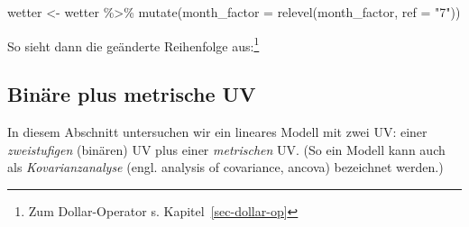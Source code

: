 \documentclass[
  letterpaper,
  twoside,
  open=any]{scrbook}
\newenvironment{Shaded}{\begin{snugshade}}{\end{snugshade}}
\newcommand{\AttributeTok}[1]{\textcolor[rgb]{0.40,0.45,0.13}{#1}}
\newcommand{\DocumentationTok}[1]{\textcolor[rgb]{0.37,0.37,0.37}{\textit{#1}}}
\newcommand{\FunctionTok}[1]{\textcolor[rgb]{0.28,0.35,0.67}{#1}}
\newcommand{\NormalTok}[1]{\textcolor[rgb]{0.00,0.23,0.31}{#1}}
\newcommand{\OtherTok}[1]{\textcolor[rgb]{0.00,0.23,0.31}{#1}}
\newcommand{\SpecialCharTok}[1]{\textcolor[rgb]{0.37,0.37,0.37}{#1}}
\newcommand{\StringTok}[1]{\textcolor[rgb]{0.13,0.47,0.30}{#1}}
\theoremstyle{definition}
\theoremstyle{definition}
\theoremstyle{definition}
\theoremstyle{remark}
\begin{document}
\begin{Shaded}
\begin{Highlighting}[]
\NormalTok{wetter }\OtherTok{\textless{}{-}}
\NormalTok{  wetter }\SpecialCharTok{\%\textgreater{}\%} 
  \FunctionTok{mutate}\NormalTok{(}\AttributeTok{month\_factor =} \FunctionTok{relevel}\NormalTok{(month\_factor, }\AttributeTok{ref =} \StringTok{"7"}\NormalTok{))}
\end{Highlighting}
\end{Shaded}

So sieht dann die geänderte Reihenfolge aus:\footnote{Zum
  Dollar-Operator s. Kapitel~\ref{sec-dollar-op}}

\begin{Shaded}
\end{Shaded}

\subsection{Binäre plus metrische UV}\label{sec-faktorvar}

In diesem Abschnitt untersuchen wir ein lineares Modell mit zwei UV:
einer \emph{zweistufigen} (binären) UV plus einer \emph{metrischen} UV.
(So ein Modell kann auch als \emph{Kovarianzanalyse} (engl. analysis of
covariance, ancova) bezeichnet werden.)
\end{document}
